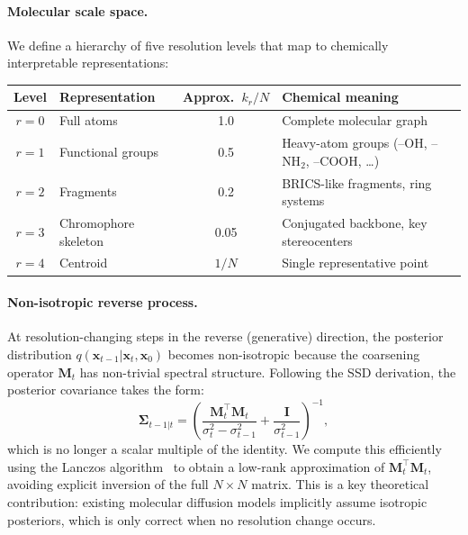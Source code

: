 \documentclass[11pt,a4paper]{article}
\newcommand{\xt}{\mathbf{x}_t}
\newcommand{\xzero}{\mathbf{x}_0}
\begin{document}
\paragraph{Molecular scale space.}
We define a hierarchy of five resolution levels that map to chemically interpretable
representations:
\begin{center}
\begin{tabular}{clcl}
  \toprule
  \textbf{Level} & \textbf{Representation} & \textbf{Approx.\ $k_r/N$} & \textbf{Chemical meaning} \\
  \midrule
  $r=0$ & Full atoms          & 1.0   & Complete molecular graph \\
  $r=1$ & Functional groups   & 0.5   & Heavy-atom groups (--OH, --NH$_2$, --COOH, \ldots) \\
  $r=2$ & Fragments           & 0.2   & BRICS-like fragments, ring systems \\
  $r=3$ & Chromophore skeleton& 0.05  & Conjugated backbone, key stereocenters \\
  $r=4$ & Centroid            & $1/N$ & Single representative point \\
  \bottomrule
\end{tabular}
\end{center}

\paragraph{Non-isotropic reverse process.}
At resolution-changing steps in the reverse (generative) direction, the posterior
distribution $q(\mathbf{x}_{t-1} | \xt, \xzero)$ becomes non-isotropic because
the coarsening operator $\mathbf{M}_t$ has non-trivial spectral structure. Following
the SSD derivation, the posterior covariance takes the form:
\begin{equation}\label{eq:posterior}
  \boldsymbol{\Sigma}_{t-1|t} = \left(
    \frac{\mathbf{M}_t^\top \mathbf{M}_t}{\sigma_t^2 - \sigma_{t-1}^2}
    + \frac{\mathbf{I}}{\sigma_{t-1}^2}
  \right)^{-1},
\end{equation}
which is no longer a scalar multiple of the identity. We compute this efficiently
using the Lanczos algorithm~\citep{lanczos1950iteration} to obtain a low-rank
approximation of $\mathbf{M}_t^\top \mathbf{M}_t$, avoiding explicit inversion of
the full $N \times N$ matrix. This is a key theoretical contribution: existing
molecular diffusion models implicitly assume isotropic posteriors, which is only
correct when no resolution change occurs.
\end{document}
